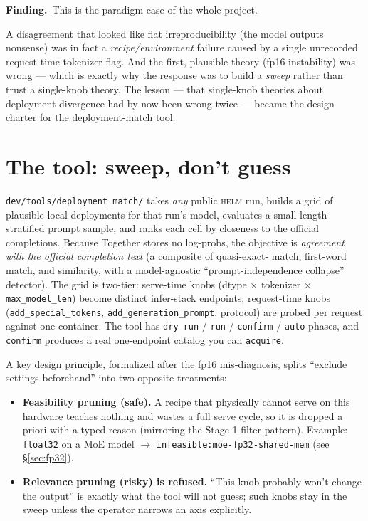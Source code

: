 \documentclass[11pt]{report}
\newcommand{\code}[1]{\texttt{#1}}
\newcommand{\finding}[1]{\par\noindent\textbf{Finding.}~#1\par}
\begin{document}
\finding{This is the paradigm case of the whole project.} A disagreement that
looked like flat irreproducibility (the model outputs nonsense) was in fact a
\emph{recipe/environment} failure caused by a single unrecorded request-time
tokenizer flag. And the first, plausible theory (fp16 instability) was wrong ---
which is exactly why the response was to build a \emph{sweep} rather than trust a
single-knob theory. The lesson --- that single-knob theories about deployment
divergence had by now been wrong twice --- became the design charter for the
deployment-match tool.

\section{The tool: sweep, don't guess}

\code{dev/tools/deployment\_match/} takes \emph{any} public \textsc{helm} run,
builds a grid of plausible local deployments for that run's model, evaluates a
small length-stratified prompt sample, and ranks each cell by closeness to the
official completions. Because Together stores no log-probs, the objective is
\emph{agreement with the official completion text} (a composite of quasi-exact-
match, first-word match, and similarity, with a model-agnostic
``prompt-independence collapse'' detector). The grid is two-tier: serve-time knobs
(dtype $\times$ tokenizer $\times$ \code{max\_model\_len}) become distinct
infer-stack endpoints; request-time knobs (\code{add\_special\_tokens},
\code{add\_generation\_prompt}, protocol) are probed per request against one
container. The tool has \code{dry-run} / \code{run} / \code{confirm} / \code{auto}
phases, and \code{confirm} produces a real one-endpoint catalog you can
\code{acquire}.

A key design principle, formalized after the fp16 mis-diagnosis, splits ``exclude
settings beforehand'' into two opposite treatments:
\begin{itemize}[nosep]
  \item \textbf{Feasibility pruning (safe).} A recipe that physically cannot serve
        on this hardware teaches nothing and wastes a full serve cycle, so it is
        dropped a priori with a typed reason (mirroring the Stage-1 filter
        pattern). Example: \code{float32} on a MoE model $\rightarrow$
        \code{infeasible:moe-fp32-shared-mem} (see \S\ref{sec:fp32}).
  \item \textbf{Relevance pruning (risky) is refused.} ``This knob probably won't
        change the output'' is exactly what the tool will not guess; such knobs
        stay in the sweep unless the operator narrows an axis explicitly.
\end{itemize}
\end{document}
